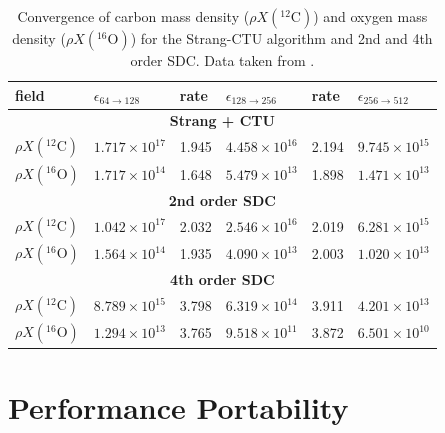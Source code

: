 \documentclass[a4paper]{jpconf}
\newcommand{\isotm}[2]{{}^{#2}\mathrm{#1}}
\begin{document}
\begin{table}[t]
\renewcommand{\arraystretch}{1.25}
\centering
\begin{tabular}{llllll}
{\bf field} & {$\epsilon_{64 \rightarrow 128}$} & 
{\bf rate} & {$\epsilon_{128\rightarrow 256}$} & 
{\bf rate} & {$\epsilon_{256\rightarrow 512}$} \\
\hline
\multicolumn{6}{c}{\bf Strang + CTU} \\
\hline
 $\rho X(\isotm{C}{12})$     & $1.717 \times 10^{17}$  & 1.945  & $4.458 \times 10^{16}$  & 2.194  & $9.745 \times 10^{15}$  \\
 $\rho X(\isotm{O}{16})$     & $1.717 \times 10^{14}$  & 1.648  & $5.479 \times 10^{13}$  & 1.898  & $1.471 \times 10^{13}$  \\
\hline
\multicolumn{6}{c}{\bf 2nd order SDC} \\
\hline
 $\rho X(\isotm{C}{12})$     & $1.042 \times 10^{17}$  & 2.032  & $2.546 \times 10^{16}$  & 2.019  & $6.281 \times 10^{15}$  \\
 $\rho X(\isotm{O}{16})$     & $1.564 \times 10^{14}$  & 1.935  & $4.090 \times 10^{13}$  & 2.003  & $1.020 \times 10^{13}$  \\
\hline
\multicolumn{6}{c}{\bf 4th order SDC} \\
\hline
 $\rho X(\isotm{C}{12})$     & $8.789 \times 10^{15}$  & 3.798  & $6.319 \times 10^{14}$  & 3.911  & $4.201 \times 10^{13}$  \\
 $\rho X(\isotm{O}{16})$     & $1.294 \times 10^{13}$  & 3.765  & $9.518 \times 10^{11}$  & 3.872  & $6.501 \times 10^{10}$  \\
\hline
\end{tabular}
\renewcommand{\arraystretch}{1.0}
\caption{\label{table:convergence} Convergence of carbon mass density
  ($\rho X(\isotm{C}{12})$) and oxygen mass density ($\rho
  X(\isotm{O}{16})$) for the Strang-CTU algorithm and 2nd and 4th
  order SDC.  Data taken from \cite{castro:sdc}.}
\end{table}

\section{Performance Portability}
\end{document}
